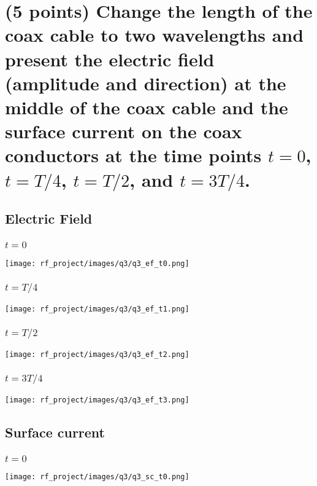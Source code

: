 \documentclass[12pt, letterpaper]{article}
\begin{document}
\section{(5 points) Change the length of the coax cable to two wavelengths and present the electric field (amplitude and direction) at the middle of the coax cable and the surface current on the coax conductors at the time points $t=0$, $t=T/4$, $t=T/2$, and $t=3T/4$.}

\subsection{Electric Field}

\subsubsection{$t=0$}

\texttt{[image: rf\_project/images/q3/q3\_ef\_t0.png]}

\subsubsection{$t=T/4$}

\texttt{[image: rf\_project/images/q3/q3\_ef\_t1.png]}

\subsubsection{$t=T/2$}

\texttt{[image: rf\_project/images/q3/q3\_ef\_t2.png]}

\subsubsection{$t=3T/4$}

\texttt{[image: rf\_project/images/q3/q3\_ef\_t3.png]}

\subsection{Surface current}

\subsubsection{$t=0$}

\texttt{[image: rf\_project/images/q3/q3\_sc\_t0.png]}
\end{document}
